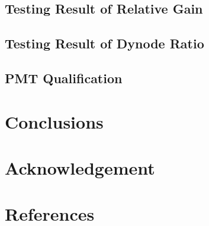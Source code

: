 \documentclass[preprint,3p,times]{elsarticle}
\begin{document}
\subsection{Testing Result of Relative Gain}
\label{sec:relative_gain}

\subsection{Testing Result of Dynode Ratio}
\label{sec:dynode_ratio}

\subsection{PMT Qualification}
\label{sec:qualification}

\section{Conclusions}
\label{sec:conclustions}

\section*{Acknowledgement}

\appendix
\section{}
\label{app:}

\section*{References}

\end{document}
